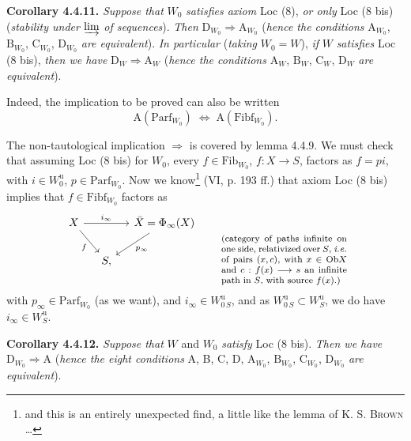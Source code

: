 \documentclass[11pt]{article}
\newcommand{\msp}[1]{\marginpar{\footnotesize [#1]}}
\newcommand{\Fib}{\mathrm{Fib}}
\newcommand{\Fibf}{\mathrm{Fibf}}
\newcommand{\Parf}{\mathrm{Parf}}
\newcommand{\Ob}{\mathrm{Ob}}
\begin{document}
\textbf{Corollary 4.4.11.} \textit{Suppose that} $W_0$ \textit{satisfies axiom} Loc (8), \textit{or only} Loc (8 bis) (\textit{stability under} $\varinjlim$ \textit{of sequences}). \textit{Then} $\mathrm{D}_{W_0} \Longrightarrow \mathrm{A}_{W_0}$ (\textit{hence the conditions} $\mathrm{A}_{W_0}$, $\mathrm{B}_{W_0}$, $\mathrm{C}_{W_0}$, $\mathrm{D}_{W_0}$ \textit{are equivalent}). \textit{In particular} (\textit{taking} $W_0 = W$), \textit{if} $W$ \textit{satisfies} Loc (8 bis), \textit{then we have} $\mathrm{D}_W \Longrightarrow \mathrm{A}_W$ (\textit{hence the conditions} $\mathrm{A}_W$, $\mathrm{B}_W$, $\mathrm{C}_W$, $\mathrm{D}_W$ \textit{are equivalent}).

Indeed, the implication to be proved can also be written
\[
\mathrm{A}(\Parf_{W_0}) \;\Longleftrightarrow\; \mathrm{A}(\Fibf_{W_0}).
\]

The non-tautological implication $\Longrightarrow$ is covered by lemma 4.4.9. We must check that assuming Loc (8 bis) for $W_0$, every $f \in \Fib_{W_0}$, $f : X \longrightarrow S$, factors as $f = pi$, with $i \in W^{\mathrm{u}}_0$, $p \in \Parf_{W_0}$. Now we know\footnote{and this is an entirely unexpected find, a little like the lemma of K. S. \textsc{Brown} \ldots} (VI, p. 193 ff.) %
\msp{page 57}
that axiom Loc (8 bis) implies that $f \in \Fibf_{W_0}$ factors as
\[
\begin{tikzcd}[column sep=small]
X \arrow[rr, "i_\infty"] \arrow[dr, "f"'] & & \bar{X} = \Phi_\infty(X) \arrow[dl, "p_\infty"] \\
& S, &
\end{tikzcd}
\qquad
\text{\parbox[t]{0.33\textwidth}{\footnotesize (category of paths infinite on one side, relativized over $S$, \textit{i.e.} of pairs $(x,c)$, with $x \in \Ob X$ and $c : f(x) \longrightarrow s$ an infinite path in $S$, with source $f(x)$.)}}
\]
with $p_\infty \in \Parf_{W_0}$ (as we want), and $i_\infty \in W^{\mathrm{u}}_{0\,S}$, and as $W^{\mathrm{u}}_{0\,S} \subset W^{\mathrm{u}}_S$, we do have $i_\infty \in W^{\mathrm{u}}_S$.

\textbf{Corollary 4.4.12.} \textit{Suppose that} $W$ and $W_0$ \textit{satisfy} Loc (8 bis). \textit{Then we have} $\mathrm{D}_{W_0} \Longrightarrow \mathrm{A}$ (\textit{hence the eight conditions} A, B, C, D, $\mathrm{A}_{W_0}$, $\mathrm{B}_{W_0}$, $\mathrm{C}_{W_0}$, $\mathrm{D}_{W_0}$ \textit{are equivalent}).
\end{document}
